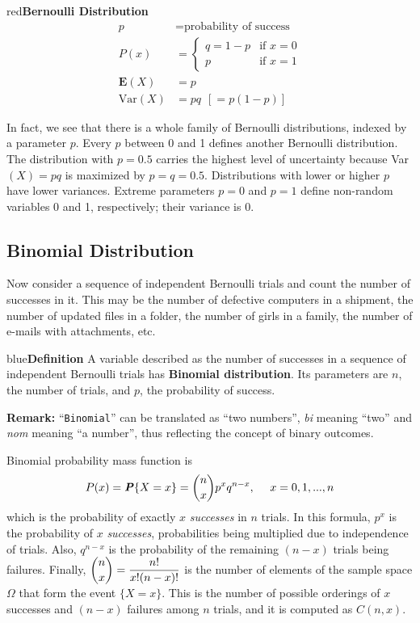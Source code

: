 \documentclass{article}
\newenvironment{definition}[1]{\begin{mybox}{blue}{\textbf{Definition #1}}}{\end{mybox}}
\newenvironment{formula}[1]{\begin{mybox}{red}{\textbf{#1}}}{\end{mybox}}
\newcommand{\prob}[1]{\textbf{\textit{P}}\{#1\}}
\begin{document}
\begin{formula}{Bernoulli Distribution}
\begin{align*}
    p &= \text{probability of success}\\
    P(x) &= \begin{cases}
                q = 1-p &\text{if $x = 0$}\\
                p &\text{if $x=1$}
            \end{cases}\\
    \mathbf{E}(X) &= p\\
    \text{Var}(X) &= pq\ \ [=p (1-p)]
\end{align*}
\end{formula}

In fact, we see that there is a whole family of Bernoulli distributions, indexed by a parameter $p$. Every $p$ between 0 and 1 defines another Bernoulli distribution. The distribution with $p = 0.5$ carries the highest level of uncertainty because Var$(X) = pq$ is maximized by $p = q = 0.5$. Distributions with lower or higher $p$ have lower variances. Extreme parameters $p = 0$ and $p = 1$ define non-random variables 0 and 1, respectively; their variance is 0.

\subsection{Binomial Distribution}

Now consider a sequence of independent Bernoulli trials and count the number of successes in it. This may be the number of defective computers in a shipment, the number of updated files in a folder, the number of girls in a family, the number of e-mails with attachments, etc.

\begin{definition}{}
A variable described as the number of successes in a sequence of independent Bernoulli trials has \textbf{Binomial distribution}. Its parameters are $n$, the number of trials, and $p$, the probability of success.
\end{definition}

\textbf{Remark:} ``\texttt{Binomial}'' can be translated as ``two numbers'', \textit{bi} meaning ``two'' and \textit{nom} meaning ``a number'', thus reflecting the concept of binary outcomes.

Binomial probability mass function is
\setcounter{equation}{8}
\begin{equation}
    P(x) = \prob{X = x} = \binom{n}{x}p^xq^{n-x},\ \ \ \ x = 0, 1, ..., n
\end{equation}
which is the probability of exactly $x$ \textit{successes} in $n$ trials. In this formula, $p^x$ is the probability of $x$ \textit{successes}, probabilities being multiplied due to independence of trials. Also, $q^{n-x}$ is the probability of the remaining $(n - x)$ trials being failures. Finally, $\dbinom{n}{x} = \dfrac{n!}{x! (n-x)!}$ is the number of elements of the sample space $\Omega$ that form the event $\{X = x\}$. This is the number of possible orderings of $x$ successes and $(n - x)$ failures among $n$ trials, and it is computed as $C(n, x)$.
\end{document}
